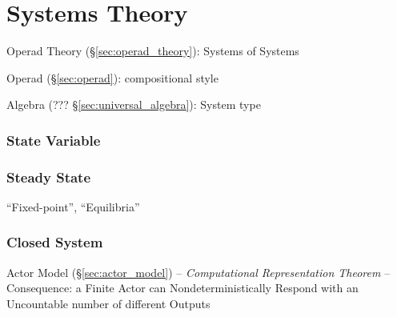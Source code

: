 \part{Systems Theory}\label{sec:systems_theory}


Operad Theory (\S\ref{sec:operad_theory}): Systems of Systems

Operad (\S\ref{sec:operad}): compositional style

Algebra (??? \S\ref{sec:universal_algebra}): System type



\section{State Variable}\label{sec:state_variable}

\section{Steady State}\label{sec:steady_state}

``Fixed-point'', ``Equilibria'' %



\section{Closed System}\label{sec:closed_system}


Actor Model (\S\ref{sec:actor_model}) -- \emph{Computational
  Representation Theorem} -- Consequence: a Finite Actor can
Nondeterministically Respond with an Uncountable number of different
Outputs %



